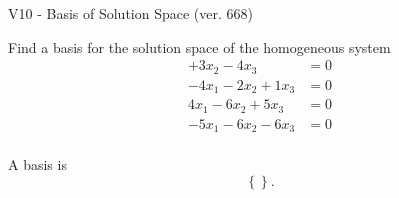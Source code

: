 \begin{exercise}
  \begin{exerciseTitle}V10 - Basis of Solution Space (ver. 668)\end{exerciseTitle}
  \begin{exerciseStatement}
    Find a basis for the solution space of the homogeneous system 
\begin{align*}
 + 3 x_ 2 -4 x_ 3 &= 0  \\ 
  -4 x_ 1 -2 x_ 2 + 1 x_ 3 &= 0  \\ 
  4 x_ 1 -6 x_ 2 + 5 x_ 3 &= 0  \\ 
  -5 x_ 1 -6 x_ 2 -6 x_ 3 &= 0  \\ 
 \end{align*}


 
  \end{exerciseStatement}

  \begin{exerciseAnswer}
   A basis is   
\[\left\{\right\}.\]

  


  \end{exerciseAnswer}
\end{exercise}